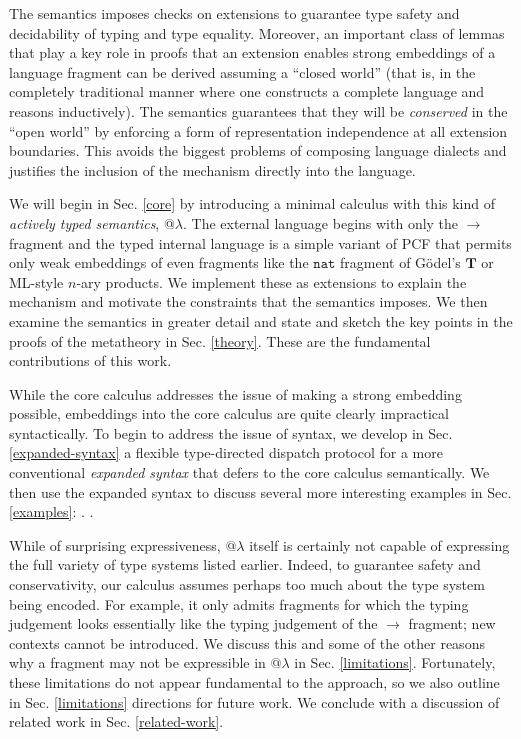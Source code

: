 \documentclass[9pt,preprint]{sigplanconf}
\begin{document}
The semantics imposes checks on extensions to guarantee type safety and decidability of typing and type equality. Moreover, an important class of lemmas that play a key role in  proofs that an extension enables strong embeddings of a language fragment can be derived assuming a ``closed world'' (that is, in the completely traditional manner where one constructs a complete language and reasons inductively). The semantics guarantees that they will be \emph{conserved} in the  ``open world'' by enforcing a form of  representation independence at all extension boundaries. This avoids the biggest problems of composing language dialects and justifies the inclusion of the mechanism directly into the language.

We will begin in Sec. \ref{core} by introducing a minimal calculus with this kind of \emph{actively typed semantics}, @$\lambda$. The external language begins with only the $\rightarrow$ fragment and the typed internal language is a simple variant of PCF that permits only weak embeddings of even fragments like the $\mathtt{nat}$ fragment of G\"odel's $\mathbf{T}$ or ML-style $n$-ary products. We implement these as extensions to explain the mechanism and motivate the constraints that the semantics imposes. We then examine the semantics in greater detail and state and sketch the key points in the proofs of the metatheory in Sec. \ref{theory}. These are the fundamental contributions of this work.

While the core calculus addresses the issue of making a strong embedding possible, embeddings into the core calculus are quite clearly impractical syntactically. To begin to address the issue of syntax, we develop in Sec. \ref{expanded-syntax} a flexible type-directed dispatch protocol for a more conventional \emph{expanded syntax} that defers to the core calculus semantically. We then use the expanded syntax to discuss several more interesting examples in Sec. \ref{examples}: . . 

While of surprising expressiveness, @$\lambda$ itself is certainly not capable of expressing the full variety of type systems listed earlier. Indeed, to guarantee safety and conservativity, our calculus assumes perhaps too much about the type system being encoded. For example, it only admits fragments for which the typing judgement looks essentially like the typing judgement of the $\rightarrow$ fragment; new contexts cannot be introduced. We discuss this and some of the other reasons why a fragment may not be expressible in @$\lambda$ in Sec. \ref{limitations}. Fortunately, these limitations do not appear fundamental to the approach, so we also outline in Sec. \ref{limitations} directions for future work. We conclude with a discussion of related work in Sec. \ref{related-work}. 
\end{document}

